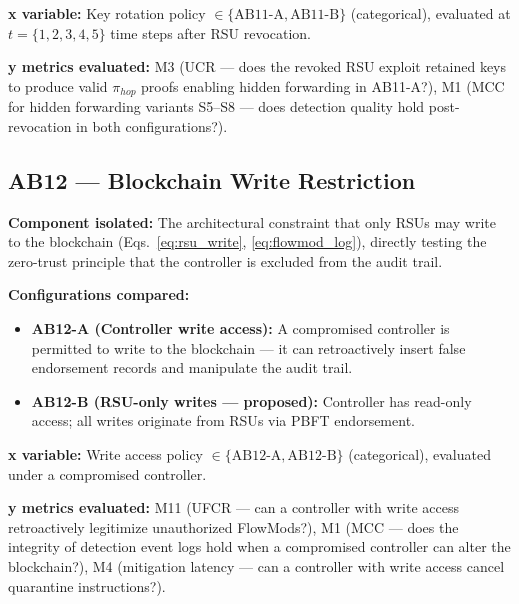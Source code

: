 \documentclass[12pt, a4paper]{report}
\begin{document}
{{\textbf{x variable:} Key rotation policy
$\in \{\text{AB11-A}, \text{AB11-B}\}$ (categorical),
evaluated at $t = \{1, 2, 3, 4, 5\}$ time steps
after RSU revocation.

\textbf{y metrics evaluated:} M3 (UCR — does the
revoked RSU exploit retained keys to produce valid
$\pi_{hop}$ proofs enabling hidden forwarding in
AB11-A?), M1 (MCC for hidden forwarding variants
S5--S8 — does detection quality hold post-revocation
in both configurations?).


\subsection{AB12 — Blockchain Write Restriction}
\label{sec:ab12}

\textbf{Component isolated:}
The architectural constraint that only \ac{RSU}s
may write to the blockchain
(Eqs.~\ref{eq:rsu_write}, \ref{eq:flowmod_log}),
directly testing the zero-trust principle that the
controller is excluded from the audit trail.

\textbf{Configurations compared:}
\begin{itemize}
    \item \textbf{AB12-A (Controller write access):}
    A compromised controller is permitted to write
    to the blockchain — it can retroactively insert
    false endorsement records and manipulate the
    audit trail.
    \item \textbf{AB12-B (RSU-only writes —
    proposed):} Controller has read-only access;
    all writes originate from \ac{RSU}s via
    \ac{PBFT} endorsement.
\end{itemize}

\textbf{x variable:} Write access policy
$\in \{\text{AB12-A}, \text{AB12-B}\}$ (categorical),
evaluated under a compromised controller.

\textbf{y metrics evaluated:} M11 (UFCR — can a
controller with write access retroactively legitimize
unauthorized FlowMods?), M1 (MCC — does the integrity
of detection event logs hold when a compromised
controller can alter the blockchain?), M4 (mitigation
latency — can a controller with write access cancel
quarantine instructions?).


}}
\end{document}
